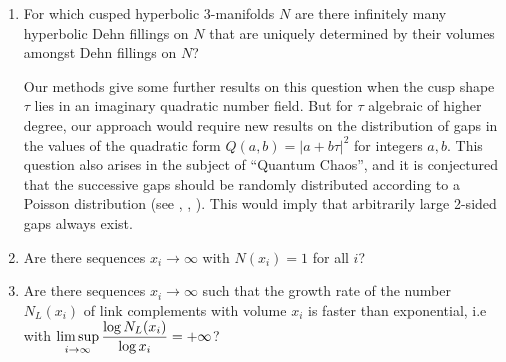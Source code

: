 \documentclass[reqno]{amsproc}  %
\def\ms{\medskip\noindent}
\def\ss{\smallskip\noindent}
\begin{document}
\begin{enumerate}
\ms
\item For which cusped hyperbolic 3-manifolds $N$ are there infinitely many hyperbolic Dehn fillings on $N$ that are uniquely determined by their volumes amongst Dehn fillings on $N$?

\ss
Our methods give some further results on this question when the cusp shape $\tau$  
lies in an imaginary quadratic number field.
But for $\tau$ algebraic of higher degree, our approach would require new results on   
the distribution of gaps in the values of the quadratic form 
$Q(a,b) =|a+ b \tau|^2$ for integers $a,b$. This question also arises
in the subject of ``Quantum Chaos'', and it is conjectured that the successive gaps 
should be randomly distributed according to a Poisson distribution
(see \cite{sarnak},  \cite{rudnick}, \cite{EMM}).
This would imply that arbitrarily large 2-sided gaps always exist.


\ms
\item  Are there sequences $x_i \to \infty$ with $N(x_i)=1$ for all $i$?

\ms
\item Are there sequences $x_i \to \infty$ such that the growth rate of the number $N_L(x_i)$ of link complements
with volume $x_i$ is faster than exponential, i.e with $\displaystyle\limsup_{i\to \infty} {\log N_L(x_i) \over \log x_i} = +\infty$?
\end{enumerate}
\end{document}
